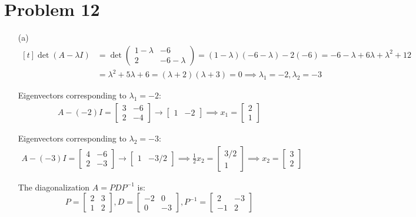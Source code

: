 \documentclass{article}
\newcommand*{\problem}[1]{\section*{Problem #1}}
\begin{document}
\problem{12}
\begin{itemize}
\item[(a)]
	$\begin{aligned}[t]
		\det(A-\lambda I)
		&=\det \begin{pmatrix}
			1-\lambda & -6 \\
			2 & -6-\lambda
		\end{pmatrix}
		=(1-\lambda)(-6-\lambda)-2(-6)
		=-6-\lambda+6\lambda+\lambda^2+12 \\
		&=\lambda^2+5\lambda+6
		=(\lambda+2)(\lambda+3)=0
		\implies \lambda_1=-2,\lambda_2=-3
	\end{aligned}$

	Eigenvectors corresponding to $\lambda_1=-2$:
	\begin{align*}
		A-(-2)I=\begin{bmatrix}
			3 & -6 \\
			2 & -4
		\end{bmatrix}
		\rightarrow \begin{bmatrix}
			1 & -2
		\end{bmatrix}
		\implies x_1=\begin{bmatrix}
			2 \\ 1
		\end{bmatrix}
	\end{align*}

	Eigenvectors corresponding to $\lambda_2=-3$:
	\begin{align*}
		A-(-3)I=\begin{bmatrix}
			4 & -6 \\
			2 & -3
		\end{bmatrix}
		\rightarrow \begin{bmatrix}
			1 & -3/2
		\end{bmatrix}
		\implies \frac12x_2=\begin{bmatrix}
			3/2 \\ 1
		\end{bmatrix}
		\implies x_2=\begin{bmatrix}
			3 \\ 2
		\end{bmatrix}
	\end{align*}

	The diagonalization $A=PDP^{-1}$ is:
	\begin{equation*}
		\boxed{P=\begin{bmatrix}
			2 & 3 \\
			1 & 2
		\end{bmatrix},
		D=\begin{bmatrix}
			-2 & 0 \\
			0 & -3
		\end{bmatrix},
		P^{-1}=\begin{bmatrix}
			2 & -3 \\
			-1 & 2
		\end{bmatrix}}
	\end{equation*}


\end{itemize}
\end{document}

